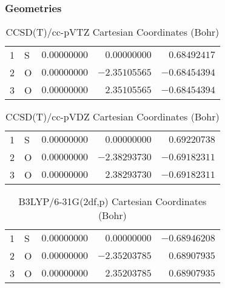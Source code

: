 \documentclass[10pt,oneside]{article}
\begin{document}
\clearpage

\subsection{\ \ \ }

\subsubsection*{Geometries}
\begin{table}[h!]
\centering
\caption{CCSD(T)/cc-pVTZ Cartesian Coordinates (Bohr)}
\begin{tabular}{llrrr}
1  & S  & $ 0.00000000$ & $ 0.00000000$ & $ 0.68492417$ \\
2  & O  & $ 0.00000000$ & $-2.35105565$ & $-0.68454394$ \\
3  & O  & $ 0.00000000$ & $ 2.35105565$ & $-0.68454394$ \\
\end{tabular}
\end{table}

\begin{table}[h!]
\centering
\caption{CCSD(T)/cc-pVDZ Cartesian Coordinates (Bohr)}
\begin{tabular}{llrrr}
1  & S  & $ 0.00000000$ & $ 0.00000000$ & $ 0.69220738$ \\
2  & O  & $ 0.00000000$ & $-2.38293730$ & $-0.69182311$ \\
3  & O  & $ 0.00000000$ & $ 2.38293730$ & $-0.69182311$ \\
\end{tabular}
\end{table}

\begin{table}[h!]
\centering
\caption{B3LYP/6-31G(2df,p) Cartesian Coordinates (Bohr)}
\begin{tabular}{llrrr}
1  & S  & $ 0.00000000$ & $ 0.00000000$ & $-0.68946208$ \\
2  & O  & $ 0.00000000$ & $-2.35203785$ & $ 0.68907935$ \\
3  & O  & $ 0.00000000$ & $ 2.35203785$ & $ 0.68907935$ \\
\end{tabular}
\end{table}

\clearpage
\end{document}
